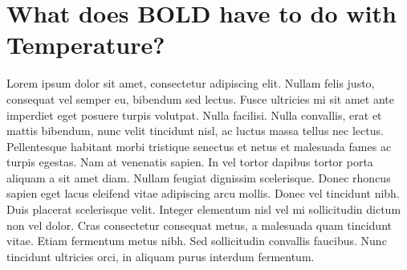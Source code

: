 \section{What does BOLD have to do with Temperature?}
Lorem ipsum dolor sit amet, consectetur adipiscing elit. Nullam felis justo, consequat vel semper eu, bibendum sed lectus. Fusce ultricies mi sit amet ante imperdiet eget posuere turpis volutpat. Nulla facilisi. Nulla convallis, erat et mattis bibendum, nunc velit tincidunt nisl, ac luctus massa tellus nec lectus. Pellentesque habitant morbi tristique senectus et netus et malesuada fames ac turpis egestas. Nam at venenatis sapien. In vel tortor dapibus tortor porta aliquam a sit amet diam. Nullam feugiat dignissim scelerisque. Donec rhoncus sapien eget lacus eleifend vitae adipiscing arcu mollis. Donec vel tincidunt nibh. Duis placerat scelerisque velit. Integer elementum nisl vel mi sollicitudin dictum non vel dolor. Cras consectetur consequat metus, a malesuada quam tincidunt vitae. Etiam fermentum metus nibh. Sed sollicitudin convallis faucibus. Nunc tincidunt ultricies orci, in aliquam purus interdum fermentum. 